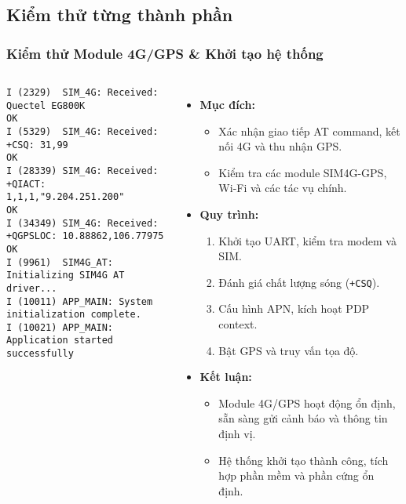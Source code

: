 \subsection{Kiểm thử từng thành phần}

\begin{frame}[t,fragile]
\frametitle{Kiểm thử Module 4G/GPS \& Khởi tạo hệ thống}
\begin{columns}[T]
    \begin{verbatim}
I (2329)  SIM_4G: Received: Quectel EG800K
OK
I (5329)  SIM_4G: Received: +CSQ: 31,99
OK
I (28339) SIM_4G: Received: +QIACT: 1,1,1,"9.204.251.200"
OK
I (34349) SIM_4G: Received: +QGPSLOC: 10.88862,106.77975
OK
I (9961)  SIM4G_AT: Initializing SIM4G AT driver...
I (10011) APP_MAIN: System initialization complete.
I (10021) APP_MAIN: Application started successfully
    \end{verbatim}

    \begin{itemize}
        \item \textbf{Mục đích:} 
        \begin{itemize}
            \item Xác nhận giao tiếp AT command, kết nối 4G và thu nhận GPS.
            \item Kiểm tra các module SIM4G-GPS, Wi-Fi và các tác vụ chính.
        \end{itemize}
        \item \textbf{Quy trình:}
        \begin{enumerate}
            \item Khởi tạo UART, kiểm tra modem và SIM.
            \item Đánh giá chất lượng sóng (\texttt{+CSQ}).
            \item Cấu hình APN, kích hoạt PDP context.
            \item Bật GPS và truy vấn tọa độ.
        \end{enumerate}
        \item \textbf{Kết luận:} 
        \begin{itemize}
            \item Module 4G/GPS hoạt động ổn định, sẵn sàng gửi cảnh báo và thông tin định vị.
            \item Hệ thống khởi tạo thành công, tích hợp phần mềm và phần cứng ổn định.
        \end{itemize}
    \end{itemize}
\end{columns}
\end{frame}
